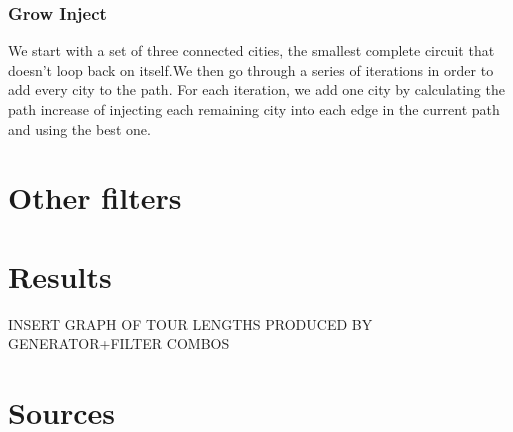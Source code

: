 \documentclass{article}
\begin{document}
\section*{Grow Inject}%
We start with a set of three connected cities, the smallest complete circuit that doesn't loop back on itself.We then go through a series of iterations in order to add every city to the path. For each iteration, we add one city by calculating the path increase of injecting each remaining city into each edge in the current path and using the best one.

\part*{Other filters}

\part*{Results}
INSERT GRAPH OF TOUR LENGTHS PRODUCED BY GENERATOR+FILTER COMBOS


\part*{Sources}
\end{document}
